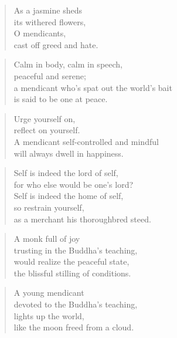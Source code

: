 \documentclass[12pt,openany]{book}%
\begin{document}
\begin{verse}%
As a jasmine sheds \\
its withered flowers, \\
O mendicants, \\
cast off greed and hate. 

%
\end{verse}

\begin{verse}%
Calm in body, calm in speech, \\
peaceful and serene; \\
a mendicant who’s spat out the world’s bait \\
is said to be one at peace. 

%
\end{verse}

\begin{verse}%
Urge yourself on, \\
reflect on yourself. \\
A mendicant self-controlled and mindful \\
will always dwell in happiness. 

%
\end{verse}

\begin{verse}%
Self is indeed the lord of self, \\
for who else would be one’s lord? \\
Self is indeed the home of self, \\
so restrain yourself, \\
as a merchant his thoroughbred steed. 

%
\end{verse}

\begin{verse}%
A monk full of joy \\
trusting in the Buddha’s teaching, \\
would realize the peaceful state, \\
the blissful stilling of conditions. 

%
\end{verse}

\begin{verse}%
A young mendicant \\
devoted to the Buddha’s teaching, \\
lights up the world, \\
like the moon freed from a cloud. 

%
\end{verse}
\end{document}
